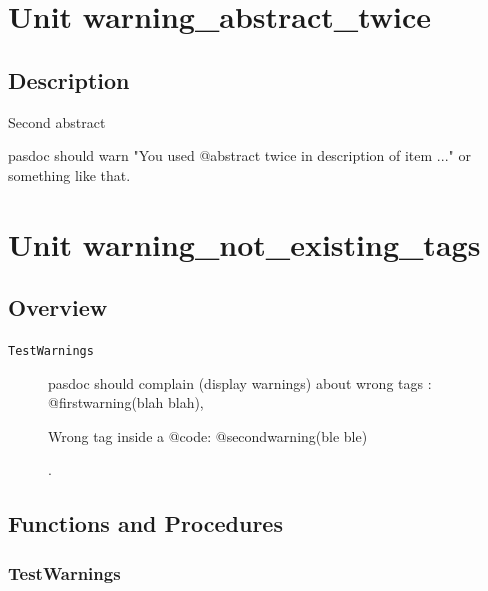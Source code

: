 \documentclass{report}
\newif\ifpdf
\begin{document}
\chapter{Unit warning{\_}abstract{\_}twice}
\label{warning_abstract_twice}
\section{Description}
Second abstract\hfill\vspace*{1ex}





pasdoc should warn "You used @abstract twice in description of item ..." or something like that.
\chapter{Unit warning{\_}not{\_}existing{\_}tags}
\label{warning_not_existing_tags}
\section{Overview}
\begin{description}
\item[\texttt{TestWarnings}]pasdoc should complain (display warnings) about wrong tags : @firstwarning(blah blah), \begin{ttfamily}Wrong tag inside a @code: @secondwarning(ble ble)\end{ttfamily}.
\end{description}
\section{Functions and Procedures}
\ifpdf
\subsection*{\large{\textbf{TestWarnings}}\normalsize\hspace{1ex}\hrulefill}
\else
\end{document}
